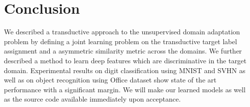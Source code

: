 \documentclass{article}
\begin{document}
\section{Conclusion} 
We described a transductive approach to the unsupervised domain adaptation problem by defining a joint learning problem on the transductive target label assignment and a asymmetric similarity metric across the domains. We further described a method to learn deep features which are discriminative in the target domain. Experimental results on digit classification using MNIST\cite{mnist} and SVHN\cite{svhn} as well as on object recognition using Office\cite{office} dataset show state of the art performance with a significant margin. We will make our learned models as well as the source code available immediately upon acceptance.



\clearpage


\end{document}
